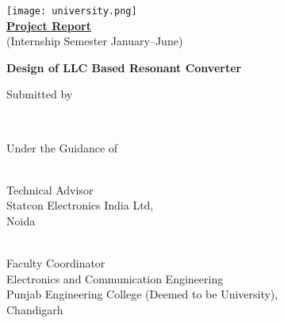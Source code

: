 \begin{titlepage}
    \begin{center}

        
        \texttt{[image: university.png]}\\
        {\href{https://thesoumilarora.github.io/Internship-Project-Report/main.pdf}{\textbf{Project Report}}}\\
        \vspace*{0.2cm}
        (Internship Semester January--June)

        \vspace*{3cm}
        {\Large\textbf {Design of LLC Based Resonant Converter}}

        \vfill
        Submitted by

        \vfill
        \textbf{
        \name \\
        \sid
        }

        \vfill
        Under the Guidance of
    \end{center}
    \vfill

    \noindent
    
    \begin{minipage}[t]{0.4\textwidth}
        \raggedright
        \industry \\
        Technical Advisor\\
        Statcon Electronics India Ltd,\\
        Noida
    \end{minipage}
    \hfill
    \begin{minipage}[t]{0.55\textwidth}
        \raggedleft
        \faculty \\
        Faculty Coordinator\\
        Electronics and Communication Engineering\\
        Punjab Engineering College (Deemed to be University),\\
        Chandigarh
    \end{minipage}
\end{titlepage}